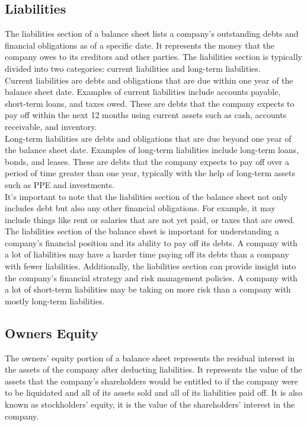 \documentclass{article}
\begin{document}
\subsection{Liabilities}

The liabilities section of a balance sheet lists a company's outstanding debts and financial obligations as of a specific date. It represents the money that the company owes to its creditors and other parties. The liabilities section is typically divided into two categories: current liabilities and long-term liabilities.\\

Current liabilities are debts and obligations that are due within one year of the balance sheet date. Examples of current liabilities include accounts payable, short-term loans, and taxes owed. These are debts that the company expects to pay off within the next 12 months using current assets such as cash, accounts receivable, and inventory.\\

Long-term liabilities are debts and obligations that are due beyond one year of the balance sheet date. Examples of long-term liabilities include long-term loans, bonds, and leases. These are debts that the company expects to pay off over a period of time greater than one year, typically with the help of long-term assets such as PPE and investments.\\

It's important to note that the liabilities section of the balance sheet not only includes debt but also any other financial obligations. For example, it may include things like rent or salaries that are not yet paid, or taxes that are owed.\\

The liabilities section of the balance sheet is important for understanding a company's financial position and its ability to pay off its debts. A company with a lot of liabilities may have a harder time paying off its debts than a company with fewer liabilities. Additionally, the liabilities section can provide insight into the company's financial strategy and risk management policies. A company with a lot of short-term liabilities may be taking on more risk than a company with mostly long-term liabilities.

\subsection{Owners Equity}
The owners' equity portion of a balance sheet represents the residual interest in the assets of the company after deducting liabilities. It represents the value of the assets that the company's shareholders would be entitled to if the company were to be liquidated and all of its assets sold and all of its liabilities paid off. It is also known as stockholders' equity, it is the value of the shareholders' interest in the company.
\end{document}
